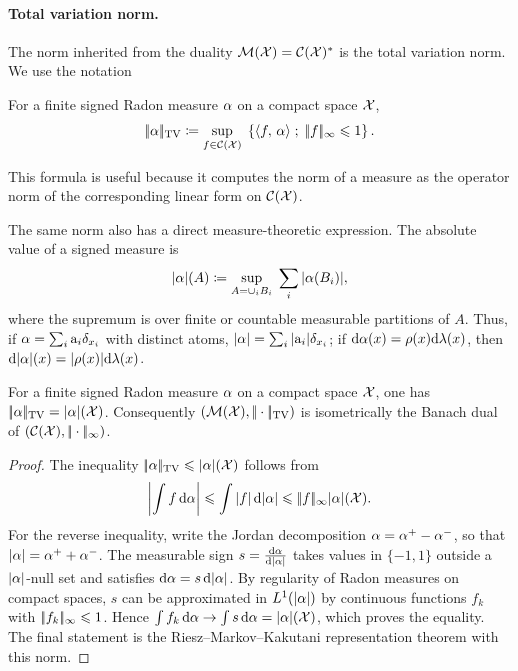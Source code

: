 \paragraph{Total variation norm.}

The norm inherited from the duality $\mathcal{M}(\mathcal{X})=\mathcal{C}(\mathcal{X})^*$ is the total variation norm. We use the notation
\begin{defn}\label{defn-total-variation}
	For a finite signed Radon measure $\alpha$ on a compact space $\mathcal{X}$,
	\[
		|\!| \alpha |\!|_{\operatorname{TV}}
		\coloneqq
		\underset{f \in \mathcal{C}(\mathcal{X})}{\sup}\; \left\{ \langle f,\,\alpha\rangle \;;\; |\!| f |\!|_\infty \leqslant 1 \right\}.
	\]
\end{defn}
This formula is useful because it computes the norm of a measure as the operator norm of the corresponding linear form on $\mathcal{C}(\mathcal{X})$.

The same norm also has a direct measure-theoretic expression. The absolute value of a signed measure is
\[
	|\alpha|(A)
	\coloneqq
	\underset{A=\cup_i B_i}{\sup}\; \sum_i |\alpha(B_i)|,
\]
where the supremum is over finite or countable measurable partitions of $A$. Thus, if $\alpha=\sum_i \mathrm{a}_i \delta_{x_i}$ with distinct atoms, $|\alpha|=\sum_i |\mathrm{a}_i|\delta_{x_i}$; if $\mathrm{d}\alpha(x)=\rho(x)\mathrm{d}\lambda(x)$, then $\mathrm{d}|\alpha|(x)=|\rho(x)|\mathrm{d}\lambda(x)$.

\begin{prop}\label{prop-tv-dual-measure}
	For a finite signed Radon measure $\alpha$ on a compact space $\mathcal{X}$,
	one has $|\!| \alpha |\!|_{\operatorname{TV}}=|\alpha|(\mathcal{X})$.
	Consequently $(\mathcal{M}(\mathcal{X}),|\!| \cdot |\!|_{\operatorname{TV}})$ is isometrically the Banach dual of $(\mathcal{C}(\mathcal{X}),|\!| \cdot |\!|_\infty)$.
\end{prop}
\begin{proof}
	The inequality $|\!| \alpha |\!|_{\operatorname{TV}}\leqslant |\alpha|(\mathcal{X})$ follows from
	\[
		\left\lvert\int f\,\mathrm{d}\alpha\right\rvert\leqslant \int |f|\,\mathrm{d}|\alpha|\leqslant |\!| f |\!|_\infty |\alpha|(\mathcal{X}).
	\]
	For the reverse inequality, write the Jordan decomposition $\alpha=\alpha^+-\alpha^-$, so that $|\alpha|=\alpha^++\alpha^-$. The measurable sign $s=\frac{\mathrm{d}\alpha}{\mathrm{d}|\alpha|}$ takes values in $\{-1,1\}$ outside a $|\alpha|$-null set and satisfies $\mathrm{d}\alpha=s\,\mathrm{d}|\alpha|$. By regularity of Radon measures on compact spaces, $s$ can be approximated in $L^1(|\alpha|)$ by continuous functions $f_k$ with $|\!| f_k |\!|_\infty\leqslant1$. Hence $\int f_k\,\mathrm{d}\alpha\to\int s\,\mathrm{d}\alpha=|\alpha|(\mathcal{X})$, which proves the equality. The final statement is the Riesz--Markov--Kakutani representation theorem with this norm.
\end{proof}


